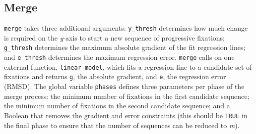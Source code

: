 \documentclass[doc,biblatex]{apa7}
\begin{document}
\subsection{Merge}

\noindent
\texttt{merge} takes three additional arguments: \texttt{y\_thresh} determines how much change is required on the \textit{y}-axis to start a new sequence of progressive fixations; \texttt{g\_thresh} determines the maximum absolute gradient of the fit regression lines; and \texttt{e\_thresh} determines the maximum regression error. \texttt{merge} calls on one external function, \texttt{linear\_model}, which fits a regression line to a candidate set of fixations and returns \texttt{g}, the absolute gradient, and \texttt{e}, the regression error (RMSD). The global variable \texttt{phases} defines three parameters per phase of the merge process: the minimum number of fixations in the first candidate sequence; the minimum number of fixations in the second candidate sequence; and a Boolean that removes the gradient and error constraints (this should be \texttt{TRUE} in the final phase to ensure that the number of sequences can be reduced to \textit{m}).
\end{document}
